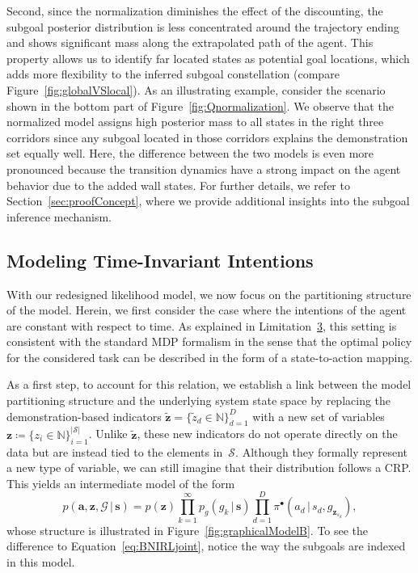 \documentclass[twoside,11pt]{article}
\newcommand{\p}{p}
\newcommand{\given}{\,\vert\,}
\newcommand{\softmax}{{\pi}}
\newcommand{\defeq}{\coloneqq}
\newcommand{\eqkomma}{,}
\begin{document}
Second, since the normalization %
diminishes the effect of the discounting, the subgoal posterior distribution is less concentrated around the trajectory ending and shows significant mass along the extrapolated path of the agent. %
This property allows us to identify %
far located states as potential goal locations, which adds more flexibility to the inferred subgoal constellation (compare Figure~\ref{fig:globalVSlocal}). 
%
As an illustrating example, consider the scenario shown in the bottom part of Figure~\ref{fig:Qnormalization}. We observe that the normalized model assigns high posterior mass to all states in the %
right three corridors since any subgoal located in those corridors explains the demonstration set equally well. Here, the difference between the two models is even more pronounced because the transition dynamics have a strong impact on the agent behavior due to the added wall states. %
For further details, we refer to Section~\ref{sec:proofConcept}, where we provide additional insights into the subgoal inference mechanism.









\subsection{Modeling Time-Invariant Intentions}
\label{sec:ddBNIRL-S}
With our redesigned likelihood model, we now focus on the partitioning structure of the model. Herein, we first consider the case where the intentions of the agent are constant with respect to time. As explained in Limitation~\hyperref[phantom:lim3]{3}, this setting is consistent with the standard MDP formalism in the sense that the optimal policy for the considered task can be described in the form of a state-to-action mapping. 

As a first step, to account for this relation, we establish a link between the model partitioning structure and the underlying system state space by replacing
%
%
%
%
%
%
%
%
the demonstration-based indicators $\mathbf{\tilde{z}}=\{\tilde{z}_d\in\mathbb{N}\}_{d=1}^{D}$ with a new set of variables $\mathbf{z}\defeq\{{z}_i\in\mathbb{N}\}_{i=1}^{|\mathcal{S}|}$. Unlike $\mathbf{\tilde{z}}$, %
these new indicators do not operate directly on the data 
but %
are instead tied to the elements in~$\mathcal{S}$. %
Although they formally represent a new type of variable, %
we can still imagine that their distribution follows a CRP. This yields an intermediate model of the form
\begin{equation*}
\p(\mathbf{a},\mathbf{z},\mathcal{G} \given \mathbf{s}) = \p(\mathbf{z}) \prod_{k=1}^{\infty} \p_g(g_k \given \mathbf{s}) \prod_{d=1}^D \softmax^\bullet(a_d \given s_d, g_{\mathbf{z}_{s_d}}) \eqkomma %
\end{equation*}
whose structure is illustrated in Figure~\ref{fig:graphicalModelB}. To see the difference to Equation~\eqref{eq:BNIRLjoint}, notice the way %
the subgoals are indexed in this model. %
%
%
\end{document}
